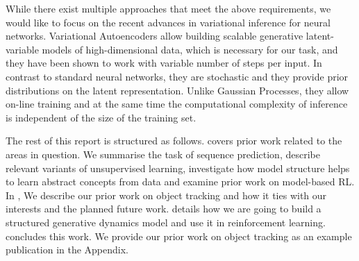    While there exist multiple approaches that meet the above requirements, we would like to focus on the recent advances in variational inference for neural networks.
    Variational Autoencoders allow building scalable generative latent-variable models of high-dimensional data, which is necessary for our task, and they have been shown to work with variable number of steps per input.  In contrast to standard neural networks, they are stochastic and they provide prior distributions on the latent representation. Unlike Gaussian Processes, they allow on-line training and at the same time the computational complexity of inference is independent of the size of the training set. 

    The rest of this report is structured as follows.
     covers prior work related to the areas in question.
    We summarise the task of sequence prediction, describe relevant variants of unsupervised learning, investigate how model structure helps to learn abstract concepts from data and examine prior work on model-based RL.
    In , We describe our prior work on object tracking and how it ties with our interests and the planned future work.
     details how we are going to build a structured generative dynamics model and use it in reinforcement learning.
     concludes this work. We provide our prior work on object tracking as an example publication in the Appendix.





